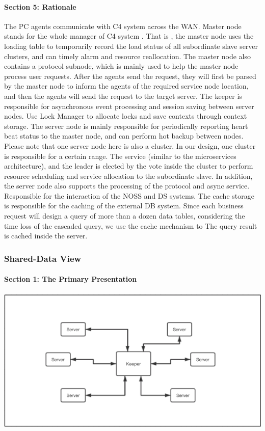\documentclass{article}
\begin{document}
			\paragraph{Section 5: Rationale}
			The PC agents communicate with C4 system across the WAN. 
			Master node stands for the whole manager of C4 system . That is ,  the master node uses the loading table to temporarily record the load status of all subordinate slave server clusters, and can timely alarm and resource reallocation. The master node also contains a protocol subnode, which is mainly used to help the master node process user requests. After the agents send the request, they will first be parsed by the master node to inform the agents of the required service node location, and then the agents will send the request to the target server.	
			The keeper is responsible for asynchronous event processing and session saving between server nodes. Use Lock Manager to allocate locks and save contexts through context storage.
			The server node is mainly responsible for periodically reporting heart beat status to the master node, and can perform hot backup between nodes. Please note that one server node here is also a cluster. In our design, one cluster is responsible for a certain range. The service (similar to the microservices architecture), and the leader is elected by the vote inside the cluster to perform resource scheduling and service allocation to the subordinate slave. In addition, the server node also supports the processing of the protocol and async service. Responsible for the interaction of the NOSS and DS systems. The cache storage is responsible for the caching of the external DB system. Since each business request will design a query of more than a dozen data tables, considering the time loss of the cascaded query, we use the cache mechanism to The query result is cached inside the server.

		\subsubsection{Shared-Data View} 
			\paragraph{Section 1: The Primary Presentation}
			\begin{center}
			\includegraphics[scale=0.3]{share.png}
			\end{center}
\end{document}
